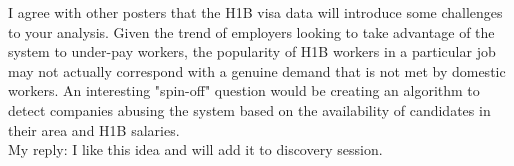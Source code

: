 I agree with other posters that the H1B visa data will introduce some challenges to your analysis. Given the trend of employers looking to take advantage of the system to under-pay workers, the popularity of H1B workers in a particular job may not actually correspond with a genuine demand that is not met by domestic workers. An interesting "spin-off" question would be creating an algorithm to detect companies abusing the system based on the availability of candidates in their area and H1B salaries.\\
My reply: I like this idea and will add it to discovery session.




